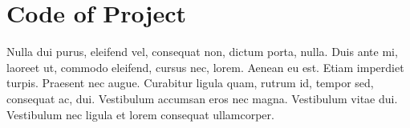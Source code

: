 \chapter{Code of Project}%
\label{chapter:appendixA}

Nulla dui purus, eleifend vel, consequat non, dictum porta, nulla. Duis ante mi, laoreet ut, commodo eleifend, cursus nec, lorem. Aenean eu est. Etiam imperdiet turpis. Praesent nec augue. Curabitur ligula quam, rutrum id, tempor sed, consequat ac, dui. Vestibulum accumsan eros nec magna. Vestibulum vitae dui. Vestibulum nec ligula et lorem consequat ullamcorper. 

